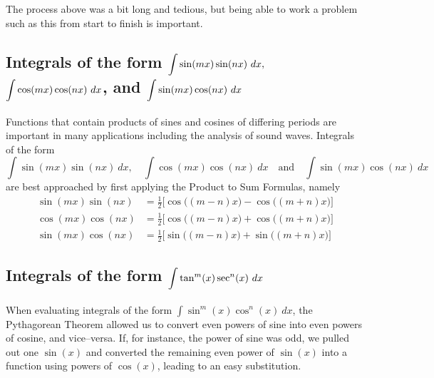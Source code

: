 

The process above was a bit long and tedious, but being able to work a problem such as this from start to finish is important.


\subsection*{Integrals of the form $\ds \int\sin(mx)\sin(nx)\ dx,$ $\ds\int \cos(mx)\cos(nx)\ dx$, and $\ds\int \sin(mx)\cos(nx)\ dx$}

Functions that contain products of sines and cosines of differing periods are important in many applications including the analysis of sound waves. Integrals of the form \small
$$\int\sin(mx)\sin(nx)\ dx,\quad \int \cos(mx)\cos(nx)\ dx \quad \text{and}\quad\int \sin(mx)\cos(nx)\ dx$$ \normalsize
are best approached by first applying the Product to Sum Formulas, namely
\begin{align*}
\sin(mx)\sin(nx) &= \frac12\Big[\cos\big((m-n)x\big)-\cos\big((m+n)x\big)\Big] \\
\cos(mx)\cos(nx) &= \frac12\Big[\cos\big((m-n)x\big)+\cos\big((m+n)x\big)\Big] \\
\sin(mx)\cos(nx) &=	\frac12\Big[\sin\big((m-n)x\big)+\sin\big((m+n)x\big)\Big]
\end{align*}


\subsection*{Integrals of the form $\displaystyle\int\tan^m(x)\sec^n(x)\ dx$} 

When evaluating integrals of the form $\int \sin^m(x)\cos^n(x)\ dx$, the Pythagorean Theorem allowed us to convert even powers of sine into even powers of cosine, and vice--versa. If, for instance, the power of sine was odd, we pulled out one $\sin(x)$ and converted the remaining even power of $\sin(x)$ into a function using powers of $\cos(x)$, leading to an easy substitution.


